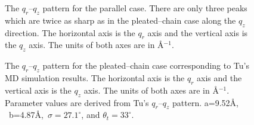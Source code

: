 \begin{itemize}
\end{itemize}

\begin{figure}
\centerline {}
\caption{The $q_r$--$q_z$ pattern for the parallel case. There are only three
peaks which are twice as sharp as in the pleated--chain case along the $q_z$
direction. The horizontal axis is the $q_r$ axis and the vertical axis is 
the $q_z$ axis. The units of both axes are in \AA$^{-1}$.
\label{sun}}
\end{figure}

\begin{figure}
\centerline {}
\caption{The $q_r$--$q_z$ pattern for the pleated--chain case corresponding to 
Tu's MD simulation results.
The horizontal axis is the $q_r$ axis and the vertical axis is 
the $q_z$ axis. The units of both axes are in \AA$^{-1}$.
 Parameter values are derived from Tu's
$q_r$--$q_z$ pattern. a=9.52\AA,
\ b=4.87\AA,\ $\sigma= 27.1^{\circ}$, and $\theta_{t}=33^{\circ}$. 
\label{klein}}
\end{figure}

